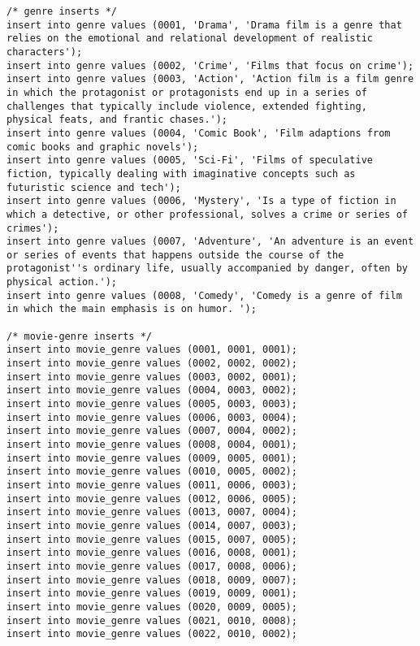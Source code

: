 \documentclass[12pt]{article}
\begin{document}
\begin{lstlisting}
/* genre inserts */
insert into genre values (0001, 'Drama', 'Drama film is a genre that relies on the emotional and relational development of realistic characters');
insert into genre values (0002, 'Crime', 'Films that focus on crime');
insert into genre values (0003, 'Action', 'Action film is a film genre in which the protagonist or protagonists end up in a series of challenges that typically include violence, extended fighting, physical feats, and frantic chases.');
insert into genre values (0004, 'Comic Book', 'Film adaptions from comic books and graphic novels');
insert into genre values (0005, 'Sci-Fi', 'Films of speculative fiction, typically dealing with imaginative concepts such as futuristic science and tech');
insert into genre values (0006, 'Mystery', 'Is a type of fiction in which a detective, or other professional, solves a crime or series of crimes');
insert into genre values (0007, 'Adventure', 'An adventure is an event or series of events that happens outside the course of the protagonist''s ordinary life, usually accompanied by danger, often by physical action.');
insert into genre values (0008, 'Comedy', 'Comedy is a genre of film in which the main emphasis is on humor. ');

/* movie-genre inserts */
insert into movie_genre values (0001, 0001, 0001);
insert into movie_genre values (0002, 0002, 0002);
insert into movie_genre values (0003, 0002, 0001);
insert into movie_genre values (0004, 0003, 0002);
insert into movie_genre values (0005, 0003, 0003);
insert into movie_genre values (0006, 0003, 0004);
insert into movie_genre values (0007, 0004, 0002);
insert into movie_genre values (0008, 0004, 0001);
insert into movie_genre values (0009, 0005, 0001);
insert into movie_genre values (0010, 0005, 0002);
insert into movie_genre values (0011, 0006, 0003);
insert into movie_genre values (0012, 0006, 0005);
insert into movie_genre values (0013, 0007, 0004);
insert into movie_genre values (0014, 0007, 0003);
insert into movie_genre values (0015, 0007, 0005);
insert into movie_genre values (0016, 0008, 0001);
insert into movie_genre values (0017, 0008, 0006);
insert into movie_genre values (0018, 0009, 0007);
insert into movie_genre values (0019, 0009, 0001);
insert into movie_genre values (0020, 0009, 0005);
insert into movie_genre values (0021, 0010, 0008);
insert into movie_genre values (0022, 0010, 0002);






\end{lstlisting}
\end{document}
